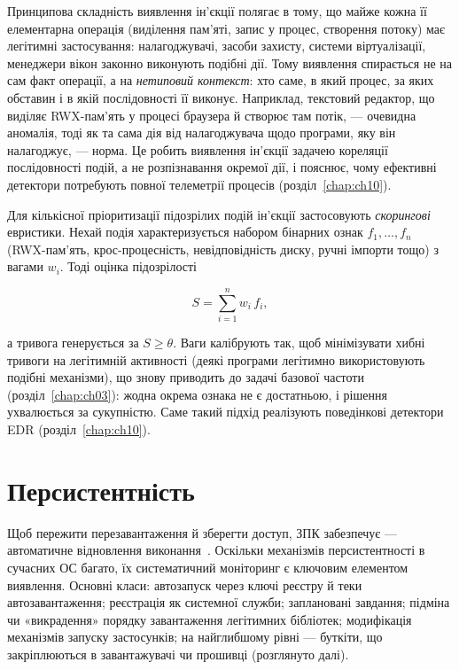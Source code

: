 Принципова складність виявлення ін'єкції полягає в тому, що майже кожна її елементарна операція (виділення пам'яті, запис у процес, створення потоку) має легітимні застосування: налагоджувачі, засоби захисту, системи віртуалізації, менеджери вікон законно виконують подібні дії. Тому виявлення спирається не на сам факт операції, а на \emph{нетиповий контекст}: хто саме, в який процес, за яких обставин і в якій послідовності її виконує. Наприклад, текстовий редактор, що виділяє RWX-пам'ять у процесі браузера й створює там потік, --- очевидна аномалія, тоді як та сама дія від налагоджувача щодо програми, яку він налагоджує, --- норма. Це робить виявлення ін'єкції задачею кореляції послідовності подій, а не розпізнавання окремої дії, і пояснює, чому ефективні детектори потребують повної телеметрії процесів (розділ~\ref{chap:ch10}).

Для кількісної пріоритизації підозрілих подій ін'єкції застосовують \emph{скорингові} евристики. Нехай подія характеризується набором бінарних ознак $f_1,\dots,f_n$ (RWX-пам'ять, крос-процесність, невідповідність диску, ручні імпорти тощо) з вагами $w_i$. Тоді оцінка підозрілості

\begin{equation}
S = \sum_{i=1}^{n} w_i\, f_i,
\label{eq:ch05-score}
\end{equation}

а тривога генерується за $S \ge \theta$. Ваги калібрують так, щоб мінімізувати хибні тривоги на легітимній активності (деякі програми легітимно використовують подібні механізми), що знову приводить до задачі базової частоти (розділ~\ref{chap:ch03}): жодна окрема ознака не є достатньою, і рішення ухвалюється за сукупністю. Саме такий підхід реалізують поведінкові детектори EDR (розділ~\ref{chap:ch10}).

\section{Персистентність}\label{sec:ch05-persistence}

Щоб пережити перезавантаження й зберегти доступ, ЗПК забезпечує  --- автоматичне відновлення виконання~\cite{ch05:attck-persist,ch05:russinovich}. Оскільки механізмів персистентності в сучасних ОС багато, їх систематичний моніторинг є ключовим елементом виявлення. Основні класи: автозапуск через ключі реєстру й теки автозавантаження; реєстрація як системної служби; заплановані завдання; підміна чи «викрадення» порядку завантаження легітимних бібліотек; модифікація механізмів запуску застосунків; на найглибшому рівні --- буткіти, що закріплюються в завантажувачі чи прошивці (розглянуто далі).

